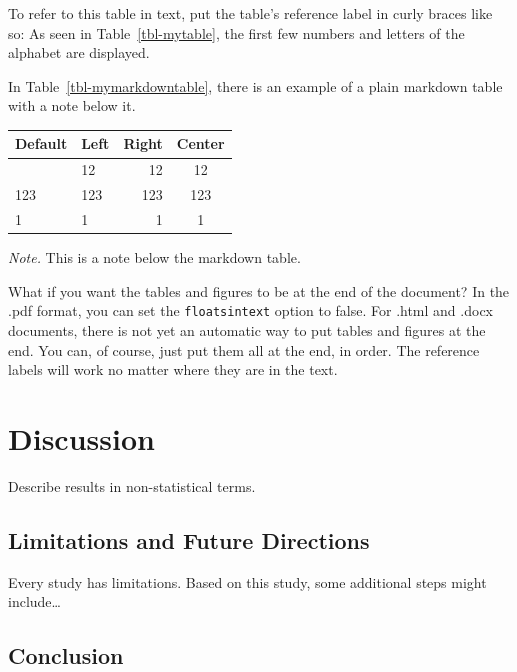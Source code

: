 \documentclass[
  man,
  floatsintext,
  longtable,
  colorlinks=true,linkcolor=blue,citecolor=blue,urlcolor=blue]{apa7}
\begin{document}
To refer to this table in text, put the table's reference label in curly
braces like so: As seen in Table~\ref{tbl-mytable}, the first few
numbers and letters of the alphabet are displayed.

In Table~\ref{tbl-mymarkdowntable}, there is an example of a plain
markdown table with a note below it.

\begin{table}

{\caption{{Table caption of a markdown
table}{\label{tbl-mymarkdowntable}}}
\vspace{-20pt}}

\begin{longtable}[]{@{}llrc@{}}
\toprule\noalign{}
Default & Left & Right & Center \\
\midrule\noalign{}
\endhead
\bottomrule\noalign{}
\endlastfoot
12 & 12 & 12 & 12 \\
123 & 123 & 123 & 123 \\
1 & 1 & 1 & 1 \\
\end{longtable}

{\vspace{-20pt}
\noindent \emph{Note.} This is a note below the markdown table.}

\end{table}

What if you want the tables and figures to be at the end of the
document? In the .pdf format, you can set the \texttt{floatsintext}
option to false. For .html and .docx documents, there is not yet an
automatic way to put tables and figures at the end. You can, of course,
just put them all at the end, in order. The reference labels will work
no matter where they are in the text.

\section{Discussion}\label{discussion}

Describe results in non-statistical terms.

\subsection{Limitations and Future
Directions}\label{limitations-and-future-directions}

Every study has limitations. Based on this study, some additional steps
might include\ldots{}

\subsection{Conclusion}\label{conclusion}
\end{document}

